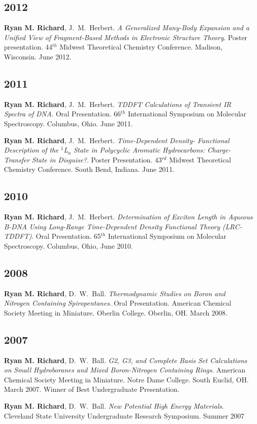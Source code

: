 \begin{etaremune}
	\subsection{2012}
		\item{\textbf{Ryan M. Richard}, J.~M.~Herbert. {\em A Generalized
		      Many-Body Expansion and a Unified View of Fragment-Based Methods
			  in Electronic Structure Theory}.  Poster presentation.
			  44$^{th}$ Midwest Theoretical Chemistry Conference.  Madison,
			  Wisconsin.  June 2012.}

	\subsection{2011}
	\item{\textbf{Ryan M. Richard}, J.~M.~Herbert.  {\em TDDFT Calculations of
	Transient IR Spectra of DNA}.  Oral Presentation.  66$^{th}$ International
	Symposium on Molecular Spectroscopy.  Columbus, Ohio.  June 2011.}
	\item{\textbf{Ryan M. Richard}, J.~M.~Herbert.  {\em Time-Dependent Density-
	      Functional Description of the $^1$L$_a$ State in Polycyclic Aromatic
		  Hydrocarbons: Charge-Transfer State in Disguise?}.  Poster
		  Presentation. 43$^{rd}$ Midwest Theoretical Chemistry Conference.
		  South Bend, Indiana. June 2011.}

	\subsection{2010}
	\item{\textbf{Ryan M. Richard}, J.~M.~Herbert.  {\em Determination of
	      Exciton Length in Aqueous B-DNA Using Long-Range Time-Dependent
		  Density Functional Theory (LRC-TDDFT)}.  Oral Presentation.
		  65$^{th}$ International Symposium on Molecular Spectroscopy.
		  Columbus, Ohio, June 2010.}

	\subsection{2008}
	\item{\textbf{Ryan M. Richard}, D.~W.~Ball.\textit{ Thermodynamic Studies on
		  Boron and Nitrogen Containing Spiropentanes}. Oral Presentation.
		  American Chemical Society Meeting in Miniature. Oberlin College.
		  Oberlin, OH.  March 2008.}

	\subsection{2007}
	\item{\textbf{Ryan M. Richard}, D.~W.~Ball. \textit{G2, G3, and Complete
	      Basis Set Calculations on Small Hydroboranes and Mixed Boron-Nitrogen
		  Containing Rings}. American Chemical Society Meeting in Miniature.
		  Notre Dame College. South Euclid, OH.  March 2007. Winner of Best
		  Undergraduate Presentation.}
	\item{\textbf{Ryan M. Richard}, D.~W.~Ball. \textit{New Potential High
	      Energy Materials}. Cleveland State University Undergraduate Research
		  Symposium. Summer 2007}
\end{etaremune}

